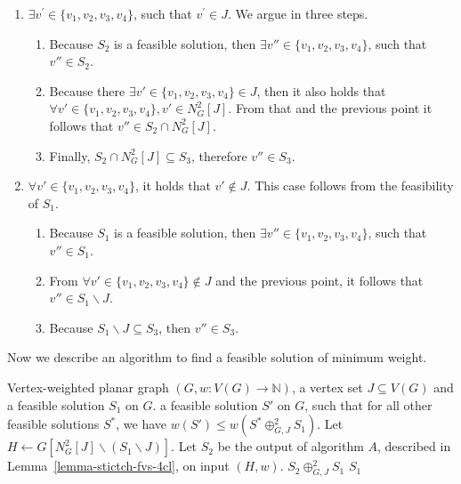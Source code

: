 \begin{enumerate}[label=\textbf{•}]
    \item $\exists v^{\prime} \in \{v_1,v_2,v_3,v_4\}$, such that $v^{\prime} \in J$. We argue in three steps.

    \begin{enumerate}
        \item Because $S_2$ is a feasible solution, then $\exists v'' \in \{v_1, v_2, v_3, v_4\}$,
        such that $v'' \in S_2$.
        \item Because there $\exists v' \in \{v_1,v_2,v_3,v_4\} \in J$, then it also holds
        that $\forall  v' \in \{v_1,v_2,v_3,v_4\}, v' \in N^{2}_{G}[J]$. From that and the previous 
        point it follows that $v'' \in S_2 \cap N^{2}_{G}[J]$.
        \item Finally, $S_2 \cap N^{2}_{G}[J] \subseteq S_3$, therefore $v'' \in S_3$.
    \end{enumerate}

    \item $\forall v' \in \{v_1,v_2,v_3,v_4\}$, it holds that $v' \notin J$.
    This case follows from the feasibility of $S_1$.

    \begin{enumerate}
        \item Because $S_1$ is a feasible solution, then $\exists v'' \in \{v_1,v_2,v_3,v_4\}$,
        such that $v'' \in S_1$.
        \item From $\forall v' \in \{v_1,v_2,v_3,v_4\} \notin J$ and the previous point, it follows 
        that $v'' \in S_1 \backslash J$.
        \item Because $S_1 \backslash J \subseteq S_3$, then $v'' \in S_3$.
    \end{enumerate}

\end{enumerate}

\noindent Now we describe an algorithm to find a feasible solution of minimum weight.

\begin{algorithm}[H]
    \caption{Stitch-FVS-4CL}
    \label{alg:stitch-fvs-4cl}
    \begin{algorithmic}[1]
    \REQUIRE Vertex-weighted planar graph $(G, w:V(G) \to \mathbb{N})$, a vertex set $J \subseteq V(G)$ and
    a feasible solution $S_1$ on $G$.
    \ENSURE a feasible solution $S'$ on $G$, such that for all other feasible solutions $S^{*}$, 
    we have $w(S') \leq w(S^{*} \oplus^{2}_{G,J} S_1)$. 
    \STATE Let $H \leftarrow G[N^{2}_{G}[J] \backslash (S_1 \backslash J)]$. \label{state:construct-H}
    \STATE Let $S_2$ be the output of algorithm $A$, described in Lemma~\ref{lemma-stictch-fvs-4cl}, on 
    input $(H, w)$. \label{state:opt-solution}
        \RETURN $S_2 \oplus^{2}_{G,J} S_1$
    \ELSE
        \RETURN $S_1$
    \ENDIF
    \end{algorithmic}
\end{algorithm}


